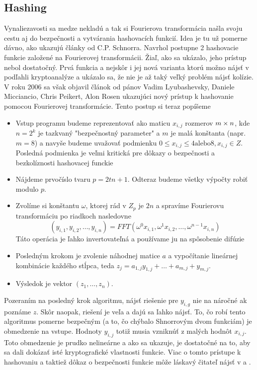 \subsection{Hashing}

Vynaliezavosti sa medze nekladú a tak si Fourierova transformácia
našla svoju cestu aj do bezpečnosti a vytvárania hashovacích funkcií.
Idea je tu už pomerne dávno, ako ukazujú články od C.P. Schnorra.
Navrhol postupne 2 hashovacie funkcie založené na Fourierovej
transformácii. Žiaľ, ako sa ukázalo, jeho prístup nebol dostatočný.
Prvá funkcia a nejskôr i jej nová varianta ktorú možno nájsť v
\cite{schnorr} podľahli kryptoanalýze a
ukázalo sa, že nie je až taký veľký problém nájsť kolízie.
V roku 2006 sa však objavil článok od pánov 
Vadim Lyubashevsky,
Daniele Micciancio,
Chris Peikert,
Alon Rosen ukazujúci nový prístup k hashovanie pomocou Fourierovej
transformácie. Tento postup si teraz popíšeme

\begin{itemize}
    \item Vstup programu budeme reprezentovať ako maticu $x_{i,j}$
    rozmerov $m\times n$, kde $n=2^k$ je tazkvaný "bezpečnostný
    parameter" a $m$ je malá konštanta (napr. $m=8$) a navyše budeme
    uvažovať podmienku $0\le x_{i,j}\le 4 \text{alebo} 8, x_{i,j}\in Z$.
    Posledná podmienka je veľmi kritická pre dôkazy o bezpečnosti a
    bezkolíznosti hashovacej funckie
    \item Nájdeme prvočíslo tvaru $p=2tn+1$. Odteraz budeme všetky
    výpočty robiť modulo $p$.
    \item Zvolíme si konštantu $\omega$, ktorej rád v $Z_p$ je $2n$ 
    a spravíme Fourierovu
    transformáciu po riadkoch nasledovne
    \begin{equation}
     (y_{i,1}, y_{i,2}, \dots, y_{i,n}) = FFT(
     \omega^0 x_{i,1}, \omega^1 x_{i,2}, \dots, \omega^{n-1}
     x_{i,n})
     \end{equation}
     Táto operácia je ľahko invertovateľná a používame ju na
     spôsobenie difúzie
    \item
     Posledným krokom je zvolenie náhodnej matice $a$ a vypočítanie
     lineárnej kombinácie každého stĺpca, teda
      $z_j = a_{1,j} y_{1,j} + \dots + a_{m,j} + y_{m,j}$.
    \item
     Výsledok je vektor $(z_1, \dots, z_n)$.
\end{itemize}
Pozeraním na posledný krok algoritmu, nájsť riešenie pre 
 $y_{i,g}$ nie na náročné ak poznáme $z$. Skôr naopak, riešení je veľa a
 dajú sa ľahko nájsť.
 To, čo robí tento algoritmus pomerne bezpečným (a to, čo chýbalo
 Shnorrovým dvom funkciám) je obmedzenie na vstupe.
 Hodnoty $y_{i,j}$ totiž musia vzniknúť z malých hodnôt $x_{i,j}$.
 Toto obmedzenie je prudko nelineárne a 
 ako sa ukazuje, je dostatočné na to, aby sa dali
 dokázať isté kryptografické vlastnosti funkcie.
 Viac o tomto prístupe k hashovaniu a taktiež dôkaz o bezpečnosti
 funkcie môže láskavý čitateľ nájsť v \cite{fft-hash} a
 \cite{fft-swifft}.
